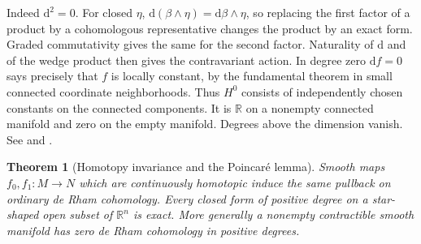 \documentclass[11pt,oneside,openany]{book}
\newtheorem{theorem}{Theorem}[chapter]
\theoremstyle{definition}
\theoremstyle{remark}
\newcommand{\R}{\mathbb R}
\newcommand{\dd}{\mathrm d}
\begin{document}
Indeed \(\dd^2=0\). For closed \(\eta\),
\(\dd(\beta\wedge\eta)=\dd\beta\wedge\eta\), so replacing the first factor
of a product by a cohomologous representative changes the product
by an exact form. Graded commutativity gives the same for the
second factor. Naturality of \(\dd\) and of the wedge product then
gives the contravariant action. In degree zero \(\dd f=0\) says
precisely that \(f\) is locally constant, by the fundamental
theorem in small connected coordinate neighborhoods. Thus
\(H^0\) consists of independently chosen constants on the
connected components. It is \(\R\) on a nonempty connected
manifold and zero on the empty manifold. Degrees above the
dimension vanish. See \cite[pp.~441--443]{lee} and
\cite[\S24]{tu}.

\begin{theorem}[Homotopy invariance and the Poincar\'e lemma]
\label{p104:M11.02}
Smooth maps \(f_0,f_1:M\to N\) which are continuously homotopic
induce the same pullback on ordinary de Rham cohomology.
Every closed form of positive degree on a star-shaped open subset
of \(\R^n\) is exact. More generally a nonempty contractible smooth
manifold has zero de Rham cohomology in positive degrees.
\end{theorem}
\end{document}
